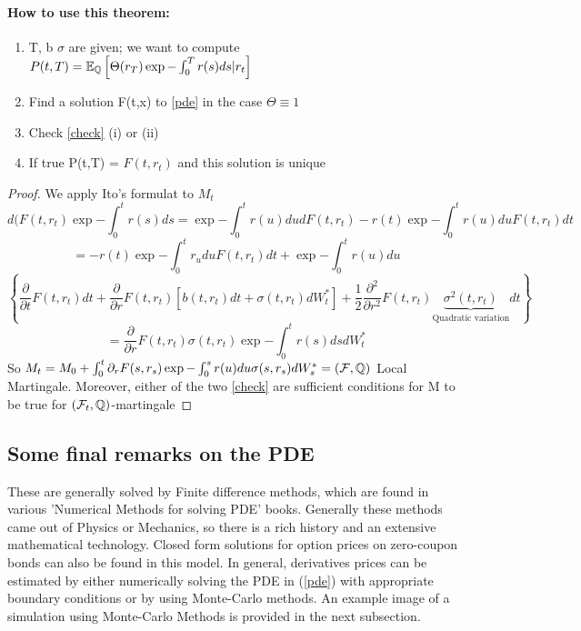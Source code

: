 \paragraph{How to use this theorem:}
\begin{enumerate}
 \item T, b $\sigma$ are given; we want to compute $P(t,T) = \mathbb{E}_{\mathbb{Q}} \left[\Theta(r_{T}) 
\exp{-\int_{0}^{T} r(s) ds} |r_{t}\right]$
\item Find a solution F(t,x) to \ref{pde} in the case $\Theta \equiv 1$
\item Check \ref{check} (i) or (ii)
\item If true P(t,T) = $F(t,r_{t})$ and this solution is unique
\end{enumerate}
\begin{proof}
We apply Ito's formulat to $M_t$
 \begin{equation*}
  d(F(t,r_{t})\exp{-\int_{0}^{t} r(s) ds} = \exp{-\int_{0}^{t} r(u) du} dF(t,r_{t}) 
- r(t) \exp{-\int_{0}^{t} r(u) du}F(t,r_{t})dt\end{equation*} \begin{equation*}
= -r(t)\exp{-\int_{0}^{t} r_{u} du}F(t,r_{t})dt + \exp{-\int_{0}^{t} r(u) du} \end{equation*}
\begin{equation*}
\left\lbrace\dfrac{\partial}{\partial t} F(t, r_{t}) dt + \dfrac{\partial}{\partial r} F(t, r_{t}) 
\left[b(t,r_{t})dt + \sigma (t,r_{t})dW^{*}_{t} \right]
+ \dfrac{1}{2} \dfrac{\partial^{2}}{\partial r^{2}}F(t,r_{t}) \underbrace{\sigma^{2}(t,r_{t})
 }_{\text{Quadratic variation}}dt\right\rbrace \end{equation*}
\begin{equation*}
= \dfrac{\partial}{\partial r} F(t, r_{t}) \sigma (t, r_{t}) \exp{-\int_{0}^{t} r(s) ds}dW_{t}^{*}
\end{equation*}
So $ M_t = M_0 + \int_{0}^{t} \partial_{r} F(s, r_s) \exp{-\int_{0}^{s} r(u) du} \sigma(s,r_{s})dW^*_s 
 = (\mathcal{F}, \mathbb{Q})$ Local Martingale. Moreover, either of the two \ref{check} are sufficient conditions
for M to be true for $(\mathcal{F}_t, \mathbb{Q})$-martingale
\end{proof}
\subsection{Some final remarks on the PDE}
These are generally solved by Finite difference methods, which are found in various 'Numerical Methods for solving PDE'
books. Generally these methods came out of Physics or Mechanics, so there is a rich history and an extensive mathematical
technology. 
Closed form solutions for option prices on zero-coupon bonds can also be found in this model. In general,
derivatives prices can be estimated by either numerically solving the PDE in (\ref{pde}) with appropriate boundary
conditions or by using Monte-Carlo methods.
An example image of a simulation using Monte-Carlo Methods is provided in the next subsection.
